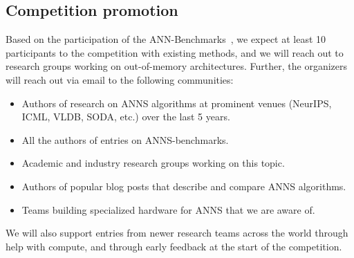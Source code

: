 \iffalse
, among others:
\begin{itemize}
\item Sanjoy Dasgupta, University of California, San Diego, \url{https://cseweb.ucsd.edu/~dasgupta/}
\item Hanan Samet, University of Maryland, \url{http://www.cs.umd.edu/~hjs/}
\item Julieta Martinez, Uber, \url{https://una-dinosauria.github.io/}
\end{itemize}
\fi

\subsection{Competition promotion}


Based on the participation of the ANN-Benchmarks~\cite{Benchmark}, 
we expect at least 10 participants to the competition with existing methods,
and we will reach out to research groups working on out-of-memory architectures.
Further, the organizers will reach out via email to the following communities:

\begin{itemize}
  \item Authors of research on ANNS algorithms at prominent venues
    (NeurIPS, ICML, VLDB, SODA,  etc.) over the last 5 years.
  \item All the authors of entries on ANNS-benchmarks.
  \item Academic and industry research groups working on this topic.
  \item Authors of popular blog posts that describe and compare ANNS
    algorithms.
  \item Teams building specialized hardware for ANNS that we are aware of.
\end{itemize}

We will also support entries from newer research teams across the
world through help with compute, and through early feedback at the
start of the competition.


